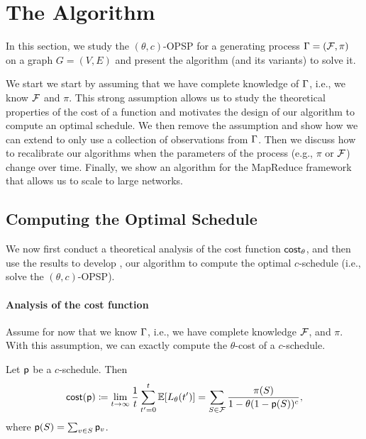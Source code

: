\section{The \algonamebasecaps{} Algorithm}\label{sec:method}
In this section, we study the $(\theta,c)$-OPSP for a generating process
$\Gamma=(\mathcal{F},\pi)$ on a graph $G=(V,E)$ and present the algorithm \algoname
(and its variants) to solve it.

We start we start by assuming that we have complete knowledge of $\Gamma$, i.e.,
we know $\mathcal{F}$ and $\pi$. This strong assumption allows us to study the
theoretical properties of the cost of a function and motivates the design of
our algorithm \algoname to compute an optimal schedule. We then remove the
assumption and show how we can extend \algoname to only use a collection of
observations from $\Gamma$. Then we discuss how to recalibrate our algorithms when
the parameters of the process (e.g., $\pi$ or $\mathcal{F}$) change over time.
Finally, we show an algorithm for the MapReduce framework that allows us to
scale to large networks.

\subsection{Computing the Optimal Schedule}\label{sec:optimize}
We now first conduct a theoretical analysis of the cost function $\mathsf{cost}_\theta$,
and then use the results to develop \algoname, our algorithm to compute the
optimal $c$-schedule (i.e., solve the $(\theta,c)$-OPSP).

\paragraph{Analysis of the cost function}
Assume for now that we know $\Gamma$, i.e., we have complete knowledge $\mathcal{F}$,
and $\pi$. With this assumption, we can exactly compute the $\theta$-cost of a
$c$-schedule.

\begin{lemma}\label{lem:explicit}
Let $\mathsf{p}$ be a $c$-schedule. Then
\begin{equation}\label{eq:explicit}
	\mathsf{cost}(\mathsf{p}) \coloneqq
	\lim_{t\rightarrow\infty}\frac{1}{t}\sum_{t'=0}^t\mathbb{E}[L_\theta(t')] =
	\sum_{S\in \mathcal{F}} \frac{\pi(S)}{1- \theta(1-\mathsf{p}(S))^c},
\end{equation}
where $\mathsf{p}(S) = \sum_{v\in S} \mathsf{p}_v$.
\end{lemma}

